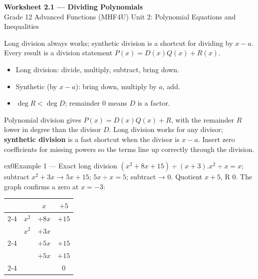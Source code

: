 \documentclass[11pt]{article}
\begin{document}
\begin{center}
{\LARGE\bfseries\color{titleblue}Worksheet 2.1 --- Dividing Polynomials}\\[2pt]
{\small Grade 12 Advanced Functions (MHF4U) \textperiodcentered{} Unit 2: Polynomial Equations and Inequalities}
\end{center}

\begin{ideabox}
Long division always works; synthetic division is a shortcut for dividing by $x-a$. Every result is a division statement $P(x)=D(x)Q(x)+R(x)$.
\begin{itemize}[leftmargin=*,itemsep=2pt]
  \item Long division: divide, multiply, subtract, bring down.
  \item Synthetic (by $x-a$): bring down, multiply by $a$, add.
  \item $\deg R<\deg D$; remainder $0$ means $D$ is a factor.
\end{itemize}
\end{ideabox}

\begin{learnbox}
Polynomial division gives $P(x)=D(x)Q(x)+R$, with the remainder $R$ lower in degree than the divisor $D$.
Long division works for any divisor; \textbf{synthetic division} is a fast shortcut when the divisor is $x-a$.
Insert zero coefficients for missing powers so the terms line up correctly through the division.
\end{learnbox}


\begin{example}{ex0}{Example 1 --- Exact long division}
$(x^2+8x+15)\div(x+3)$.\soln $x^2\div x=x$; subtract $x^2+3x$ → $5x+15$; $5x\div x=5$; subtract → $0$. Quotient $x+5$, R $0$. The graph confirms a zero at $x=-3$:\begin{center}\renewcommand{\arraystretch}{1.2}\begin{tabular}{cccc}
&  & $x$ & $+5$ \\
\cline{2-4}
\multicolumn{1}{r|}{$x+3$} & $x^2$ & $+8x$ & $+15$ \\
\multicolumn{1}{r|}{} & $x^2$ & $+3x$ &  \\
\cline{2-4}
\multicolumn{1}{r|}{} &  & $+5x$ & $+15$ \\
\multicolumn{1}{r|}{} &  & $+5x$ & $+15$ \\
\cline{2-4}
\multicolumn{1}{r|}{} &  &  & $0$ \\
\end{tabular}\end{center}
\end{example}
\end{document}
